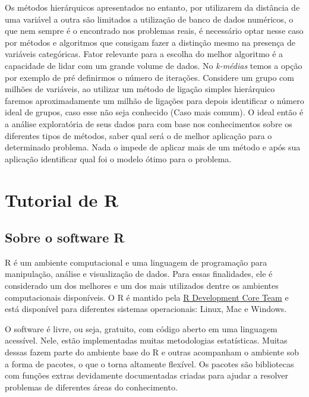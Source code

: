 \documentclass[
  letterpaper,
  DIV=11,
  numbers=noendperiod]{scrreprt}
\begin{document}
Os métodos hierárquicos apresentados no entanto, por utilizarem da
distância de uma variável a outra são limitados a utilização de banco de
dados numéricos, o que nem sempre é o encontrado nos problemas reais, é
necessário optar nesse caso por métodos e algoritmos que consigam fazer
a distinção mesmo na presença de variáveis categóricas. Fator relevante
para a escolha do melhor algoritmo é a capacidade de lidar com um grande
volume de dados. No \emph{k-médias} temos a opção por exemplo de pré
definirmos o número de iterações. Considere um grupo com milhões de
variáveis, ao utilizar um método de ligação simples hierárquico faremos
aproximadamente um milhão de ligações para depois identificar o número
ideal de grupos, caso esse não seja conhecido (Caso mais comum). O ideal
então é a análise exploratória de seus dados para com base nos
conhecimentos sobre os diferentes tipos de métodos, saber qual será o de
melhor aplicação para o determinado problema. Nada o impede de aplicar
mais de um método e após sua aplicação identificar qual foi o modelo
ótimo para o problema.

\appendix
{}

\hypertarget{tutorial-de-r}{%
\chapter{Tutorial de R}\label{tutorial-de-r}}

\hypertarget{sobre-o-software-r}{%
\section{Sobre o software R}\label{sobre-o-software-r}}

R é um ambiente computacional e uma linguagem de programação para
manipulação, análise e visualização de dados. Para essas finalidades,
ele é considerado um dos melhores e um dos mais utilizados dentre os
ambientes computacionais disponíveis. O R é mantido pela
\href{https://cran.r-project.org/}{R Development Core Team} e está
disponível para diferentes sistemas operacionais: Linux, Mac e Windows.

O software é livre, ou seja, gratuito, com código aberto em uma
linguagem acessível. Nele, estão implementadas muitas metodologias
estatísticas. Muitas dessas fazem parte do ambiente base do R e outras
acompanham o ambiente sob a forma de pacotes, o que o torna altamente
flexível. Os pacotes são bibliotecas com funções extras devidamente
documentadas criadas para ajudar a resolver problemas de diferentes
áreas do conhecimento.
\end{document}
